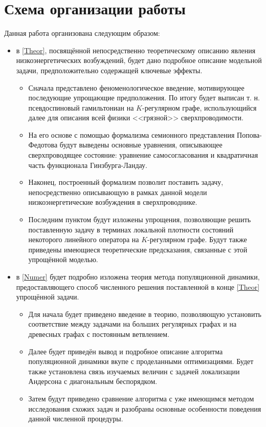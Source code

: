 \section{Схема организации работы}
Данная работа организована следующим образом:
\begin{itemize}
	\item в \autoref{Theor}, посвящённой непосредственно теоретическому описанию явления низкоэнергетических возбуждений, будет дано подробное описание модельной задачи, предположительно содержащей ключевые эффекты.
	\begin{itemize}
		\item Сначала представлено феноменологическое введение, мотивирующее последующие упрощающие предположения. По итогу будет выписан т. н. псевдоспиновый гамильтониан на $K$-регулярном графе, использующийся далее для описания всей физики <<грязной>> сверхпроводимости.
		\item На его основе с помощью формализма семионного представления Попова-Федотова будут выведены основные уравнения, описывающее сверхпроводящее состояние: уравнение самосогласования и квадратичная часть функционала Гинзбурга-Ландау.
		\item Наконец, построенный формализм позволит поставить задачу, непосредственно описывающую в рамках данной модели низкоэнергетические возбуждения в сверхпроводнике. 
		\item Последним пунктом будут изложены упрощения, позволяющие решить поставленную задачу в терминах локальной плотности состояний некоторого линейного оператора на $K$-регулярном графе. Будут также приведены имеющиеся теоретические предсказания, связанные с этой упрощённой моделью.
	\end{itemize}

	\item в \autoref{Numer} будет подробно изложена теория метода популяционной динамики, предоставляющего способ численного решения поставленной в конце \autoref{Theor} упрощённой задачи.
	\begin{itemize}
		\item Для начала будет приведено введение в теорию, позволяющую установить соответствие между задачами на больших регулярных графах и на древесных графах с постоянным ветвлением.
		\item Далее будет приведён вывод и подробное описание алгоритма популяционной динамики вкупе с проделанными оптимизациями. Будет также установлена связь изучаемых величин с задачей локализации Андерсона с диагональным беспорядком.
		\item Затем будут приведено сравнение алгоритма с уже имеющимся методом исследования схожих задач и разобраны основные особенности поведения данной численной процедуры.
	\end{itemize}


\end{itemize}
